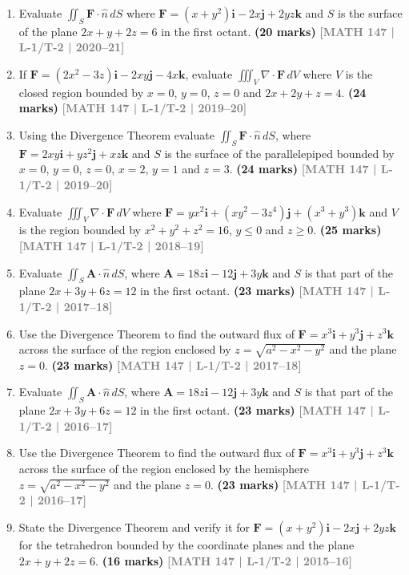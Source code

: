 \documentclass[12pt,a4paper]{article}
\newcommand{\yr}[1]{\hfill\textcolor{gray}{\small\textbf{[#1]}}}
\newcommand{\mk}[1]{\textcolor{orange!70!black}{\small\textbf{(#1 marks)}}}
\begin{document}
\begin{enumerate}\item Evaluate $\displaystyle\iint_{S}\mathbf{F}\cdot\hat{n}\,dS$ where $\mathbf{F}=(x+y^{2})\mathbf{i}-2x\mathbf{j}+2yz\mathbf{k}$ and $S$ is the surface of the plane $2x+y+2z=6$ in the first octant.
\mk{20} \yr{MATH 147 | L-1/T-2 | 2020--21}

\item If $\mathbf{F}=(2x^{2}-3z)\mathbf{i}-2xy\mathbf{j}-4x\mathbf{k}$, evaluate $\displaystyle\iiint_{V}\nabla\cdot\mathbf{F}\,dV$ where $V$ is the closed region bounded by $x=0$, $y=0$, $z=0$ and $2x+2y+z=4$.
\mk{24} \yr{MATH 147 | L-1/T-2 | 2019--20}

\item Using the Divergence Theorem evaluate $\displaystyle\iint_{S}\mathbf{F}\cdot\hat{n}\,dS$, where $\mathbf{F}=2xy\mathbf{i}+yz^{2}\mathbf{j}+xz\mathbf{k}$ and $S$ is the surface of the parallelepiped bounded by $x=0$, $y=0$, $z=0$, $x=2$, $y=1$ and $z=3$.
\mk{24} \yr{MATH 147 | L-1/T-2 | 2019--20}

\item Evaluate $\displaystyle\iiint_{V}\nabla\cdot\mathbf{F}\,dV$ where $\mathbf{F}=yx^{2}\mathbf{i}+(xy^{2}-3z^{4})\mathbf{j}+(x^{3}+y^{3})\mathbf{k}$ and $V$ is the region bounded by $x^{2}+y^{2}+z^{2}=16$, $y\le 0$ and $z\ge 0$.
\mk{25} \yr{MATH 147 | L-1/T-2 | 2018--19}

\item Evaluate $\displaystyle\iint_{S}\mathbf{A}\cdot\hat{n}\,dS$, where $\mathbf{A}=18z\mathbf{i}-12\mathbf{j}+3y\mathbf{k}$ and $S$ is that part of the plane $2x+3y+6z=12$ in the first octant.
\mk{23} \yr{MATH 147 | L-1/T-2 | 2017--18}

\item Use the Divergence Theorem to find the outward flux of $\mathbf{F}=x^{3}\mathbf{i}+y^{3}\mathbf{j}+z^{3}\mathbf{k}$ across the surface of the region enclosed by $z=\sqrt{a^{2}-x^{2}-y^{2}}$ and the plane $z=0$.
\mk{23} \yr{MATH 147 | L-1/T-2 | 2017--18}

\item Evaluate $\displaystyle\iint_{S}\mathbf{A}\cdot\hat{n}\,dS$, where $\mathbf{A}=18z\mathbf{i}-12\mathbf{j}+3y\mathbf{k}$ and $S$ is that part of the plane $2x+3y+6z=12$ in the first octant.
\mk{23} \yr{MATH 147 | L-1/T-2 | 2016--17}

\item Use the Divergence Theorem to find the outward flux of $\mathbf{F}=x^{3}\mathbf{i}+y^{3}\mathbf{j}+z^{3}\mathbf{k}$ across the surface of the region enclosed by the hemisphere $z=\sqrt{a^{2}-x^{2}-y^{2}}$ and the plane $z=0$.
\mk{23} \yr{MATH 147 | L-1/T-2 | 2016--17}

\item State the Divergence Theorem and verify it for $\mathbf{F}=(x+y^{2})\mathbf{i}-2x\mathbf{j}+2yz\mathbf{k}$ for the tetrahedron bounded by the coordinate planes and the plane $2x+y+2z=6$.
\mk{16} \yr{MATH 147 | L-1/T-2 | 2015--16}

\end{enumerate}
\end{document}

